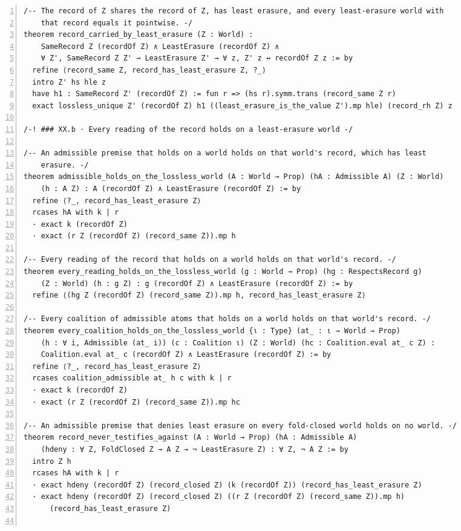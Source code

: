 \documentclass[10pt]{article}
\newcommand{\leansize}{\fontsize{5.5pt}{6.75pt}\selectfont}
\begin{document}
\begin{multicols}{2}
\begin{Verbatim}[numbers=left,firstnumber=1,numbersep=3pt,xleftmargin=2.6em,breaklines=true,breakanywhere=true,breakautoindent=false,breakindent=1.4em,breaksymbolleft={},breakanywheresymbolpre={},fontsize=\leansize]
/-- The record of Z shares the record of Z, has least erasure, and every least-erasure world with
    that record equals it pointwise. -/
theorem record_carried_by_least_erasure (Z : World) :
    SameRecord Z (recordOf Z) ∧ LeastErasure (recordOf Z) ∧
    ∀ Z', SameRecord Z Z' → LeastErasure Z' → ∀ z, Z' z ↔ recordOf Z z := by
  refine ⟨record_same Z, record_has_least_erasure Z, ?_⟩
  intro Z' hs hle z
  have h1 : SameRecord Z' (recordOf Z) := fun r => (hs r).symm.trans (record_same Z r)
  exact lossless_unique Z' (recordOf Z) h1 ((least_erasure_is_the_value Z').mp hle) (record_rh Z) z

/-! ### XX.b · Every reading of the record holds on a least-erasure world -/

/-- An admissible premise that holds on a world holds on that world's record, which has least
    erasure. -/
theorem admissible_holds_on_the_lossless_world (A : World → Prop) (hA : Admissible A) (Z : World)
    (h : A Z) : A (recordOf Z) ∧ LeastErasure (recordOf Z) := by
  refine ⟨?_, record_has_least_erasure Z⟩
  rcases hA with k | r
  · exact k (recordOf Z)
  · exact (r Z (recordOf Z) (record_same Z)).mp h

/-- Every reading of the record that holds on a world holds on that world's record. -/
theorem every_reading_holds_on_the_lossless_world (g : World → Prop) (hg : RespectsRecord g)
    (Z : World) (h : g Z) : g (recordOf Z) ∧ LeastErasure (recordOf Z) := by
  refine ⟨(hg Z (recordOf Z) (record_same Z)).mp h, record_has_least_erasure Z⟩

/-- Every coalition of admissible atoms that holds on a world holds on that world's record. -/
theorem every_coalition_holds_on_the_lossless_world {ι : Type} (at_ : ι → World → Prop)
    (h : ∀ i, Admissible (at_ i)) (c : Coalition ι) (Z : World) (hc : Coalition.eval at_ c Z) :
    Coalition.eval at_ c (recordOf Z) ∧ LeastErasure (recordOf Z) := by
  refine ⟨?_, record_has_least_erasure Z⟩
  rcases coalition_admissible at_ h c with k | r
  · exact k (recordOf Z)
  · exact (r Z (recordOf Z) (record_same Z)).mp hc

/-- An admissible premise that denies least erasure on every fold-closed world holds on no world. -/
theorem record_never_testifies_against (A : World → Prop) (hA : Admissible A)
    (hdeny : ∀ Z, FoldClosed Z → A Z → ¬ LeastErasure Z) : ∀ Z, ¬ A Z := by
  intro Z h
  rcases hA with k | r
  · exact hdeny (recordOf Z) (record_closed Z) (k (recordOf Z)) (record_has_least_erasure Z)
  · exact hdeny (recordOf Z) (record_closed Z) ((r Z (recordOf Z) (record_same Z)).mp h)
      (record_has_least_erasure Z)


\end{Verbatim}
\end{multicols}
\end{document}
